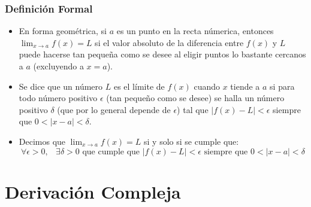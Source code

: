 \documentclass[12pt, fleqn]{report}                             %
\DeclareMathOperator \Space {\quad}                             %
\DeclareMathOperator \MiniSpace {\;}                            %
\begin{document}
            \subsection{Definición Formal}

                \begin{itemize}

                    \item
                        En forma geométrica, si $a$ es un punto en la recta númerica, entonces
                        $\lim_{x \to a} f(x) = L$ si el valor absoluto de la diferencia entre
                        $f(x)$ y $L$ puede hacerse tan pequeña como se desee al eligir puntos
                        lo bastante cercanos a $a$ (excluyendo a $x = a$).

                    \item
                        Se dice que un número $L$ es el límite de $f(x)$ cuando $x$ tiende a $a$
                        si para todo número positivo $\epsilon$ (tan pequeño como se desee) se
                        halla un número positivo $\delta$ (que por lo general depende de $\epsilon$)
                        tal que $|f(x) - L| < \epsilon$ siempre que $0 < |x - a| < \delta$.

                    \item 
                        Decimos que $\lim_{x \to a} f(x) = L$ si y solo si se cumple que:
                        \begin{equation*}
                            \forall \epsilon > 0, \MiniSpace
                                \exists \delta > 0 \text{ que cumple que }
                                    |f(x) - L| < \epsilon \text{ siempre que } 0 < |x - a| < \delta  
                        \end{equation*}

                \end{itemize}

               


    \chapter{Derivación Compleja}
        \clearpage

        \clearpage
\end{document}
